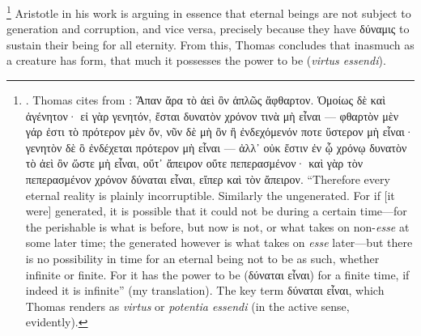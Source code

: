 %
\footnote{\Cite[q.~5, a.~4, ad 1]{st:depotentia}. Thomas cites from \cite[I, 12, 281b 25-32]{aristotle:decaelo}: Ἅπαν ἄρα τὸ ἀεὶ ὂν ἁπλῶς ἄφθαρτον. Ὁμοίως δὲ καὶ ἀγένητον· εἰ γὰρ γενητόν, ἔσται δυνατὸν χρόνον τινὰ μὴ εἶναι — φθαρτὸν μὲν γάρ ἐστι τὸ πρότερον μὲν ὄν, νῦν δὲ μὴ ὂν ἢ ἐνδεχόμενόν ποτε ὕστερον μὴ εἶναι· γενητὸν δὲ ὃ ἐνδέχεται πρότερον μὴ εἶναι — ἀλλ᾿ οὐκ ἔστιν ἐν ᾧ χρόνῳ δυνατὸν τὸ ἀεὶ ὂν ὥστε μὴ εἶναι, οὔτ᾿ ἄπειρον οὔτε πεπερασμένον· καὶ γὰρ τὸν πεπερασμένον χρόνον δύναται εἶναι, εἴπερ καὶ τὸν ἄπειρον. “Therefore every eternal reality is plainly incorruptible. Similarly the ungenerated. For if [it were] generated, it is possible that it could not be during a certain time—for the perishable is what is before, but now is not, or what takes on non-\emph{esse} at some later time; the generated however is what takes on \emph{esse} later—but there is no possibility in time for an eternal being not to be as such, whether infinite or finite. For it has the power to be (δύναται εἶναι) for a finite time, if indeed it is infinite” (my translation). The key term δύναται εἶναι, which Thomas renders as \emph{virtus} or \emph{potentia essendi} (in the active sense, evidently).}
%
Aristotle in his work is arguing in essence that eternal beings are not subject to generation and corruption, and vice versa, precisely because they have δύναμις to sustain their being for all eternity. From this, Thomas concludes that inasmuch as a creature has form, that much it possesses the power to be (\emph{virtus essendi}).%
%
